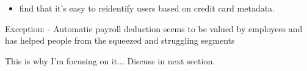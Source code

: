 \begin{itemize}
    \item \citet{demontjoye2015unique} find that it's easy to reidentify users
        based on credit card metadata.
\end{itemize}


Exception:
\citet{philipps2021supporting}
- Automatic payroll deduction seems to be valued by employees and has helped
people from the squeezed and struggling segments 

This is why I'm focusing on it... Discuss in next section.
